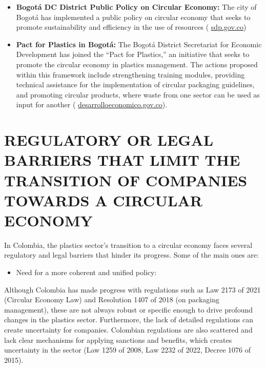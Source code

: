\documentclass[
  12pt,
  oneside]{book}
\providecommand{\tightlist}{%
  \setlength{\itemsep}{0pt}\setlength{\parskip}{0pt}}
\begin{document}
\begin{itemize}
  to promote innovation and value generation in production and
  consumption systems by optimizing, sharing, exchanging, recycling, and
  regenerating materials, water, and energy.
\item
  \textbf{Bogotá DC District Public Policy on Circular Economy: }The
  city of Bogotá has implemented a public policy on circular economy
  that seeks to promote sustainability and efficiency in the use of
  resources (
  \href{https://www.sdp.gov.co/sites/default/files/decretos-conpes/doc_conpes_dc_35_pp_ecircular.pdf?utm_source=chatgpt.com}{sdp.gov.co}{)}
\item
  \textbf{Pact for Plastics in Bogotá: }The Bogotá District Secretariat
  for Economic Development has joined the ``Pact for Plastics,'' an
  initiative that seeks to promote the circular economy in plastics
  management. The actions proposed within this framework include
  strengthening training modules, providing technical assistance for the
  implementation of circular packaging guidelines, and promoting
  circular products, where waste from one sector can be used as input
  for another (
  \href{https://desarrolloeconomico.gov.co/la-secretaria-distrital-de-desarrollo-se-une-a-la-firma-del-pacto-por-los-plasticos/?utm_source=chatgpt.com}{desarrolloeconomico.gov.co}{).}
\end{itemize}

\section{REGULATORY OR LEGAL BARRIERS THAT LIMIT THE TRANSITION OF
COMPANIES TOWARDS A CIRCULAR
ECONOMY}\label{regulatory-or-legal-barriers-that-limit-the-transition-of-companies-towards-a-circular-economy-1}

In Colombia, the plastics sector's transition to a circular economy
faces several regulatory and legal barriers that hinder its progress.
Some of the main ones are:

\begin{itemize}
\tightlist
\item
  Need for a more coherent and unified policy:
\end{itemize}

Although Colombia has made progress with regulations such as Law 2173 of
2021 (Circular Economy Law) and Resolution 1407 of 2018 (on packaging
management), these are not always robust or specific enough to drive
profound changes in the plastics sector. Furthermore, the lack of
detailed regulations can create uncertainty for companies. Colombian
regulations are also scattered and lack clear mechanisms for applying
sanctions and benefits, which creates uncertainty in the sector (Law
1259 of 2008, Law 2232 of 2022, Decree 1076 of 2015).
\end{document}
